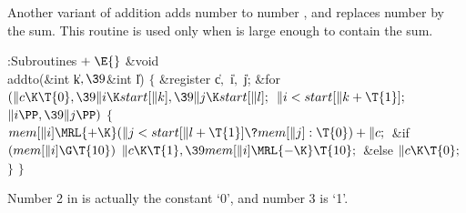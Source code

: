 Another variant of addition adds number  to number ,
and replaces number  by the sum. This routine is used only
when  is large enough to contain the
sum.

\Y\B\4:Subroutines\X${}\mathrel+\E{}$\6
\&{void} \\{addto}(\&{int} \|k${},\39{}$\&{int} \|l)\1\1\2\2\6
${}\{{}$\1\6
\&{register} \|c${},{}$ \|i${},{}$ \|j;\7
\&{for} ${}(\|c\K\T{0},\39\|i\K\\{start}[\|k],\39\|j\K\\{start}[\|l];{}$ ${}%
\|i<\\{start}[\|k+\T{1}];{}$ ${}\|i\PP,\39\|j\PP){}$\5
${}\{{}$\1\6
${}\\{mem}[\|i]\MRL{+{\K}}(\|j<\\{start}[\|l+\T{1}]\?\\{mem}[\|j]:\T{0})+%
\|c;{}$\6
\&{if} ${}(\\{mem}[\|i]\G\T{10}){}$\1\5
${}\|c\K\T{1},\39\\{mem}[\|i]\MRL{-{\K}}\T{10};{}$\2\6
\&{else}\1\5
${}\|c\K\T{0};{}$\2\6
\4${}\}{}$\2\6
\4${}\}{}$\2\par
\fi

Number 2 in  is actually the constant `0', and number 3 is
`1'.

